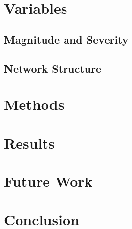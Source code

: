 \documentclass[letterpaper]{article}
\begin{document}
\section{Variables}
\subsection{Magnitude and Severity} \label{variables_nikete}


\subsection{Network Structure}


\section{Methods }


\section{Results}



\section{Future Work}


\section{Conclusion}






%
%
%




\end{document}
